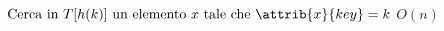 \begin{codebox}
\li	$\text{Cerca in } T[h(k)] \text{ un elemento } x \text{ tale che } \attrib{x}{key} = k$ 
	\Comment $O(n)$
\end{codebox}